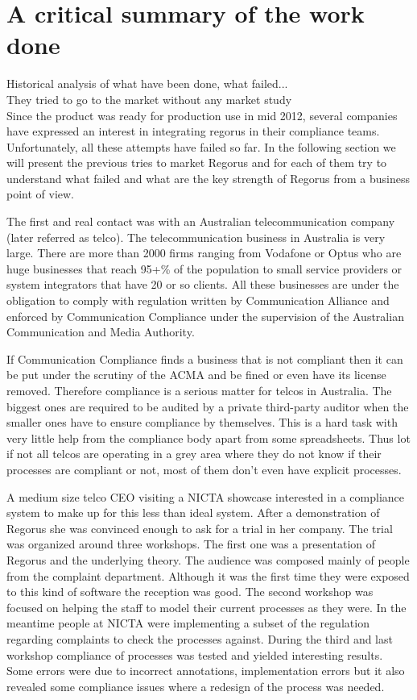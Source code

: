 \documentclass[10pt]{report}
\begin{document}
\section{A critical summary of the work done}
Historical analysis of what have been done, what failed... \\
They tried to go to the market without any market study \\

Since the product was ready for production use in mid 2012, several companies have expressed an interest in integrating regorus in their compliance teams. Unfortunately, all these attempts have failed so far. In the following section we will present the previous tries to market Regorus and for each of them try to understand what failed and what are the key strength of Regorus from a business point of view.

The first and real contact was with an Australian telecommunication company (later referred as telco). The telecommunication business in Australia is very large. There are more than 2000 firms ranging from Vodafone or Optus who are huge businesses that reach 95+\% of the population to small service providers or system integrators that have 20 or so clients. All these businesses are under the obligation to comply with regulation written by Communication Alliance and enforced by Communication Compliance under the supervision of the Australian Communication and Media Authority.

If Communication Compliance finds a business that is not compliant then it can be put under the scrutiny of the ACMA and be fined or even have its license removed. Therefore compliance is a serious matter for telcos in Australia. The biggest ones are required to be audited by a private third-party auditor when the smaller ones have to ensure compliance by themselves. This is a hard task with very little help from the compliance body apart from some spreadsheets. Thus lot if not all telcos are operating in a grey area where they do not know if their processes are compliant or not, most of them don't even have explicit processes.

A medium size telco CEO visiting a NICTA showcase interested in a compliance system to make up for this less than ideal system. After a demonstration of Regorus she was convinced enough to ask for a trial in her company. The trial was organized around three workshops. The first one was a presentation of Regorus and the underlying theory. The audience was composed mainly of people from the complaint department. Although it was the first time they were exposed to this kind of software the reception was good. The second workshop was focused on helping the staff to model their current processes as they were. In the meantime people at NICTA were implementing a subset of the regulation regarding complaints to check the processes against. During the third and last workshop compliance of processes was tested and yielded interesting results. Some errors were due to incorrect annotations, implementation errors but it also revealed some compliance issues where a redesign of the process was needed.
\end{document}
